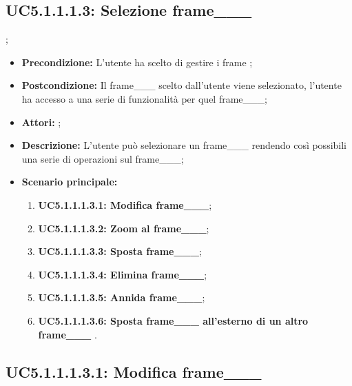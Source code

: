 \subsection{ UC5.1.1.1.3: Selezione frame___}
;
\begin{itemize}
	\item \textbf{Precondizione:} L'utente ha scelto di gestire i frame ;
	\item \textbf{Postcondizione:} Il frame___ scelto dall'utente viene selezionato, l'utente ha accesso a una serie di funzionalità per quel frame___;
	\item \textbf{Attori:} ;
	\item \textbf{Descrizione:} L'utente può selezionare un frame___ rendendo così possibili una serie di operazioni sul frame___;
	\item \textbf{Scenario principale:}
	\begin{enumerate}
		\item \textbf{ UC5.1.1.1.3.1: Modifica frame___};
		\item \textbf{ UC5.1.1.1.3.2: Zoom al frame___};
		\item \textbf{ UC5.1.1.1.3.3: Sposta frame___};
		\item \textbf{ UC5.1.1.1.3.4: Elimina frame___};
		\item \textbf{ UC5.1.1.1.3.5: Annida frame___};
		\item \textbf{ UC5.1.1.1.3.6: Sposta frame___ all'esterno di un altro frame___  }.
	\end{enumerate}
\end{itemize}
\subsection{ UC5.1.1.1.3.1: Modifica frame___}

